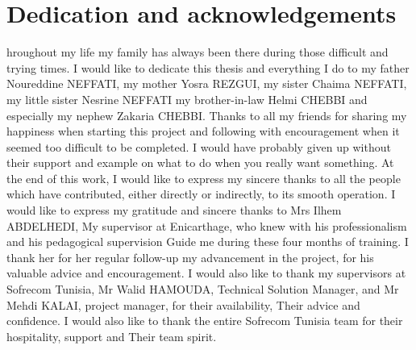 %
%

\chapter*{Dedication and acknowledgements}
\begin{SingleSpace}
hroughout my life my family has always been there during those difficult and trying times. I would 
like to dedicate this thesis and everything I do to my father Noureddine NEFFATI, my mother Yosra REZGUI, my 
sister Chaima NEFFATI, my little sister Nesrine NEFFATI my brother-in-law Helmi CHEBBI and especially my nephew 
Zakaria CHEBBI.
Thanks to all my friends for sharing my happiness when starting this project and following with encouragement when it seemed too difficult to be completed. 
I would have probably given up without their support and example on what to do when you really want something.
At the end of this work, I would like to express my sincere thanks to all the people
which have contributed, either directly or indirectly, to its smooth operation.
I would like to express my gratitude and sincere thanks to Mrs Ilhem ABDELHEDI,
My supervisor at Enicarthage, who knew with his professionalism and his pedagogical supervision
Guide me during these four months of training. I thank her for her regular follow-up
my advancement in the project, for his valuable advice and encouragement.
I would also like to thank my supervisors at Sofrecom Tunisia, Mr Walid HAMOUDA,
Technical Solution Manager, and Mr Mehdi KALAI, project manager, for their availability,
Their advice and confidence.
I would also like to thank the entire Sofrecom Tunisia team for their hospitality, support and
Their team spirit.

\end{SingleSpace}
\clearpage